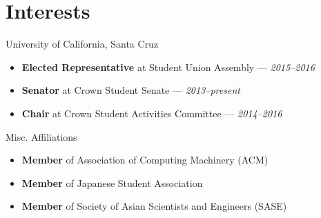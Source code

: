 \documentclass[11pt]{article}
\begin{document}
\section*{Interests}
\begin{description}
  \itemsep0pt \parskip0pt
  \item[Student Government] University of California, Santa Cruz
    \begin{itemize}
      \itemsep0pt \parskip0pt
      \item \textbf{Elected Representative} at Student Union Assembly ---
        \textit{2015--2016}
      \item \textbf{Senator} at Crown Student Senate --- \textit{2013--present}
      \item \textbf{Chair} at Crown Student Activities Committee ---
        \textit{2014--2016}
    \end{itemize}
  \item[Organizations] Misc. Affiliations
    \begin{itemize}
      \item \textbf{Member} of Association of Computing Machinery (ACM)
      \item \textbf{Member} of Japanese Student Association
      \item \textbf{Member} of Society of Asian Scientists and Engineers (SASE)
    \end{itemize}
\end{description}
\end{document}
